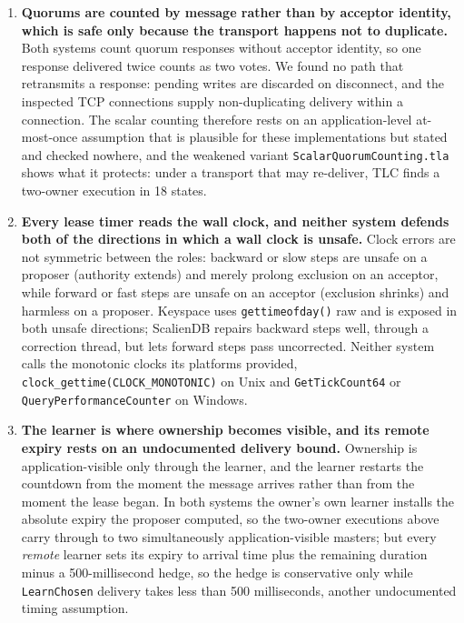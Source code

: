 \documentclass[final,5p,times,twocolumn,number]{elsarticle}
\newcommand{\code}[1]{\texttt{#1}}
\begin{document}
\begin{enumerate}
\item \textbf{Quorums are counted by message rather than by acceptor identity, which is safe only because the transport happens not to duplicate.}  Both systems count quorum responses without acceptor identity, so one response delivered twice counts as two votes.  We found no path that retransmits a response: pending writes are discarded on disconnect, and the inspected TCP connections supply non-duplicating delivery within a connection.  The scalar counting therefore rests on an application-level at-most-once assumption that is plausible for these implementations but stated and checked nowhere, and the weakened variant \code{ScalarQuorumCounting.tla} shows what it protects: under a transport that may re-deliver, TLC finds a two-owner execution in 18 states.
\item \textbf{Every lease timer reads the wall clock, and neither system defends both of the directions in which a wall clock is unsafe.}  Clock errors are not symmetric between the roles: backward or slow steps are unsafe on a proposer (authority extends) and merely prolong exclusion on an acceptor, while forward or fast steps are unsafe on an acceptor (exclusion shrinks) and harmless on a proposer.  Keyspace uses \code{gettimeofday()} raw and is exposed in both unsafe directions; ScalienDB repairs backward steps well, through a correction thread, but lets forward steps pass uncorrected.  Neither system calls the monotonic clocks its platforms provided, \code{clock\_gettime(CLOCK\_MONOTONIC)} on Unix and \code{GetTickCount64} or \code{QueryPerformanceCounter} on Windows.
\item \textbf{The learner is where ownership becomes visible, and its remote expiry rests on an undocumented delivery bound.}  Ownership is application-visible only through the learner, and the learner restarts the countdown from the moment the message arrives rather than from the moment the lease began.  In both systems the owner's own learner installs the absolute expiry the proposer computed, so the two-owner executions above carry through to two simultaneously application-visible masters; but every \emph{remote} learner sets its expiry to arrival time plus the remaining duration minus a 500-millisecond hedge, so the hedge is conservative only while \code{LearnChosen} delivery takes less than 500 milliseconds, another undocumented timing assumption.

\end{enumerate}
\end{document}
